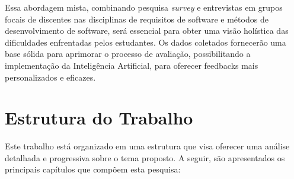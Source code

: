 Essa abordagem mista, combinando pesquisa \textit{survey} e entrevistas em grupos focais de discentes nas disciplinas de requisitos de software e métodos de desenvolvimento de software, será essencial para obter uma visão holística das dificuldades enfrentadas pelos estudantes. Os dados coletados fornecerão uma base sólida para aprimorar o processo de avaliação, possibilitando a implementação da Inteligência Artificial, para oferecer feedbacks mais personalizados e eficazes.

\section{Estrutura do Trabalho}

Este trabalho está organizado em uma estrutura que visa oferecer uma análise detalhada e progressiva sobre o tema proposto. A seguir, são apresentados os principais capítulos que compõem esta pesquisa:

